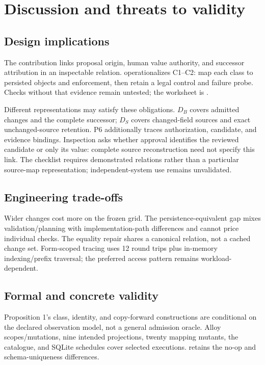 \section{Discussion and threats to validity}
\label{sec:discussion}

\subsection{Design implications}

The contribution links proposal origin, human value authority, and successor attribution in an inspectable relation.  operationalizes C1--C2: map each class to persisted objects and enforcement, then retain a legal control and failure probe. Checks without that evidence remain untested; the worksheet is .



Different representations may satisfy these obligations. $D_B$ covers admitted changes and the complete successor; $D_S$ covers changed-field sources and exact unchanged-source retention. P6 additionally traces authorization, candidate, and evidence bindings. Inspection asks whether approval identifies the reviewed candidate or only its value: complete source reconstruction need not specify this link. The checklist requires demonstrated relations rather than a particular source-map representation; independent-system use remains unvalidated.

\subsection{Engineering trade-offs}

Wider changes cost more on the frozen grid. The persistence-equivalent gap mixes validation/planning with implementation-path differences and cannot price individual checks. The equality repair shares a canonical relation, not a cached change set. Form-scoped tracing uses 12 round trips plus in-memory indexing/prefix traversal; the preferred access pattern remains workload-dependent.

\subsection{Formal and concrete validity}

Proposition 1's class, identity, and copy-forward constructions are conditional on the declared observation model, not a general admission oracle. Alloy scopes/mutations, nine intended projections, twenty mapping mutants, the catalogue, and SQLite schedules cover selected executions.  retains the no-op and schema-uniqueness differences.

